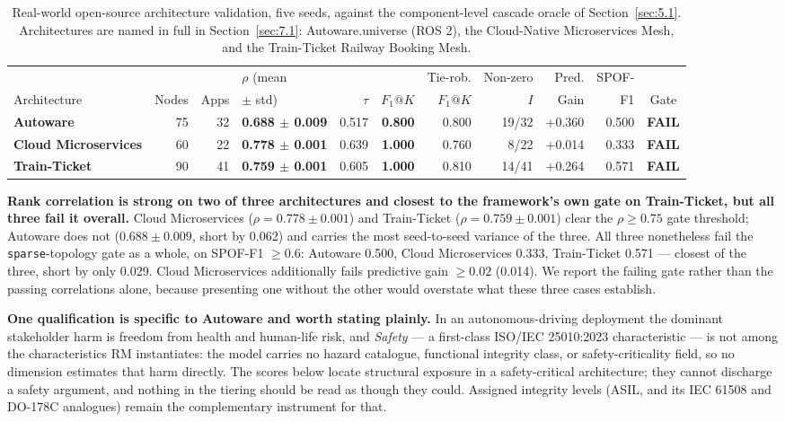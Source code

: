 \begin{table}[htbp]
\centering
\caption{Real-world open-source architecture validation, five seeds, against the component-level cascade oracle of Section~\ref{sec:5.1}. Architectures are named in full in Section~\ref{sec:7.1}: Autoware.universe (ROS 2), the Cloud-Native Microservices Mesh, and the Train-Ticket Railway Booking Mesh.}
\label{tab:13}
\setlength{\tabcolsep}{3.5pt}
\footnotesize
\begin{tabular}{@{}lrrlrrrrrrc@{}}
\toprule
& & & \(\rho\) (mean & & & Tie-rob. & Non-zero & Pred. & SPOF- & \\
Architecture & Nodes & Apps & \(\pm\) std) & \(\tau\) & \(F_1@K\) & \(F_1@K\) & \(I\) & Gain & F1 & Gate \\
\midrule
\textbf{Autoware} & 75 & 32 & \textbf{0.688 \(\pm\) 0.009} & 0.517 & \textbf{0.800} & 0.800 & 19/32 & +0.360 & 0.500 & \textbf{FAIL} \\
\textbf{Cloud Microservices} & 60 & 22 & \textbf{0.778 \(\pm\) 0.001} & 0.639 & \textbf{1.000} & 0.760 & 8/22 & +0.014 & 0.333 & \textbf{FAIL} \\
\textbf{Train-Ticket} & 90 & 41 & \textbf{0.759 \(\pm\) 0.001} & 0.605 & \textbf{1.000} & 0.810 & 14/41 & +0.264 & 0.571 & \textbf{FAIL} \\
\bottomrule
\end{tabular}
\end{table}

\textbf{Rank correlation is strong on two of three architectures and closest to the framework's own
gate on Train-Ticket, but all three fail it overall.} Cloud Microservices
(\(\rho=0.778\pm0.001\)) and Train-Ticket (\(\rho=0.759\pm0.001\)) clear the \(\rho \ge 0.75\) gate
threshold; Autoware does not (\(0.688\pm0.009\), short by 0.062) and carries the most seed-to-seed
variance of the three. All three nonetheless fail the \texttt{sparse}-topology gate as a whole, on
SPOF-F1 \(\ge 0.6\): Autoware 0.500, Cloud Microservices 0.333, Train-Ticket 0.571 --- closest of the
three, short by only 0.029. Cloud Microservices additionally fails predictive gain \(\ge 0.02\)
(0.014). We report the failing gate rather than the passing correlations alone, because presenting
one without the other would overstate what these three cases establish.

\textbf{One qualification is specific to Autoware and worth stating plainly.} In an autonomous-driving
deployment the dominant stakeholder harm is freedom from health and human-life risk, and \emph{Safety}
--- a first-class ISO/IEC 25010:2023 characteristic \cite{iso25010_2023} --- is not among the
characteristics RM instantiates: the model carries no hazard catalogue, functional integrity class, or
safety-criticality field, so no dimension estimates that harm directly. The scores below locate
structural exposure in a safety-critical architecture; they cannot discharge a safety argument, and
nothing in the tiering should be read as though they could. Assigned integrity levels (ASIL, and its
IEC 61508 and DO-178C analogues) remain the complementary instrument for that.

